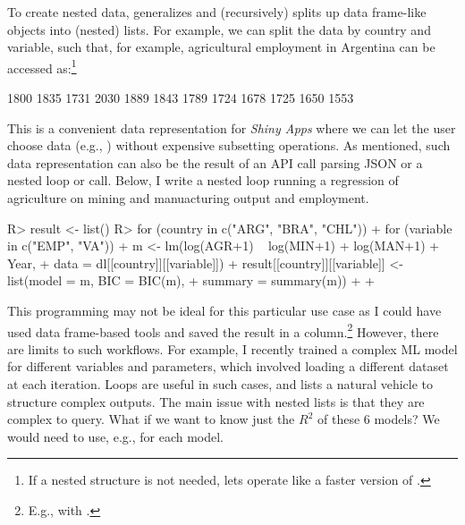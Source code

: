 \documentclass[nojss]{jss} %
\newcommand{\fct}[1]{\code{#1()}}
\begin{document}
To create nested data, \fct{rsplit} generalizes \fct{split} and (recursively) splits up data frame-like objects into (nested) lists. For example, we can split the  data by country and variable, such that, for example, agricultural employment in Argentina can be accessed as:\footnote{If a nested structure is not needed,  lets \fct{rsplit} operate like a faster version of \fct{split}.}
%
\begin{Schunk}
\begin{Soutput}
 [1] 1800 1835 1731 2030 1889 1843 1789 1724 1678 1725 1650 1553
\end{Soutput}
\end{Schunk}
%
This is a convenient data representation for \emph{Shiny Apps} where we can let the user choose data (e.g., ) without expensive subsetting operations. As mentioned, such data representation can also be the result of an API call parsing JSON or a nested loop or \fct{lapply} call. Below, I write a nested loop running a regression of agriculture on mining and manuacturing output and employment.
\begin{Schunk}
\begin{Sinput}
R> result <- list()
R> for (country in c("ARG", "BRA", "CHL")) {
+    for (variable in c("EMP", "VA")) {
+      m <- lm(log(AGR+1) ~ log(MIN+1) + log(MAN+1) + Year,
+              data = dl[[country]][[variable]])
+      result[[country]][[variable]] <- list(model = m, BIC = BIC(m),
+                                            summary = summary(m))
+    }
+  }
\end{Sinput}
\end{Schunk}
This programming may not be ideal for this particular use case as I could have used data frame-based tools and saved the result in a column.\footnote{E.g.,  with .}
However, there are limits to such workflows. For example, I recently trained a complex ML model for different variables and parameters, which involved loading a different dataset at each iteration. Loops are useful in such cases, and lists a natural vehicle to structure complex outputs. The main issue with nested lists is that they are complex to query. What if we want to know just the $R^2$ of these 6 models? We would need to use, e.g.,  for each model.\newline
\end{document}
